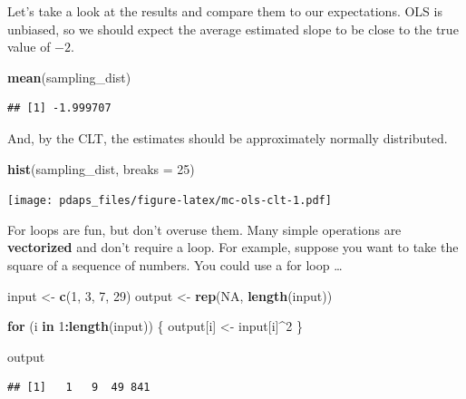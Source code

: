 \documentclass[
  12pt,
  oneside,openany]{book}
\newenvironment{Shaded}{\begin{snugshade}}{\end{snugshade}}
\newcommand{\ControlFlowTok}[1]{\textcolor[rgb]{0.13,0.29,0.53}{\textbf{#1}}}
\newcommand{\DataTypeTok}[1]{\textcolor[rgb]{0.13,0.29,0.53}{#1}}
\newcommand{\DecValTok}[1]{\textcolor[rgb]{0.00,0.00,0.81}{#1}}
\newcommand{\KeywordTok}[1]{\textcolor[rgb]{0.13,0.29,0.53}{\textbf{#1}}}
\newcommand{\NormalTok}[1]{#1}
\newcommand{\OperatorTok}[1]{\textcolor[rgb]{0.81,0.36,0.00}{\textbf{#1}}}
\newcommand{\OtherTok}[1]{\textcolor[rgb]{0.56,0.35,0.01}{#1}}
\newcommand{\StringTok}[1]{\textcolor[rgb]{0.31,0.60,0.02}{#1}}
\begin{document}
Let's take a look at the results and compare them to our expectations.
OLS is unbiased, so we should expect the average estimated slope to be close to the true value of \(-2\).

\begin{Shaded}
\begin{Highlighting}[]
\KeywordTok{mean}\NormalTok{(sampling\_dist)}
\end{Highlighting}
\end{Shaded}

\begin{verbatim}
## [1] -1.999707
\end{verbatim}

And, by the CLT, the estimates should be approximately normally distributed.

\begin{Shaded}
\begin{Highlighting}[]
\KeywordTok{hist}\NormalTok{(sampling\_dist, }\DataTypeTok{breaks =} \DecValTok{25}\NormalTok{)}
\end{Highlighting}
\end{Shaded}

\texttt{[image: pdaps\_files/figure-latex/mc-ols-clt-1.pdf]}

For loops are fun, but don't overuse them. Many simple operations are \textbf{vectorized} and don't require a loop. For example, suppose you want to take the square of a sequence of numbers. You could use a for loop \ldots{}

\begin{Shaded}
\begin{Highlighting}[]
\NormalTok{input <{-}}\StringTok{ }\KeywordTok{c}\NormalTok{(}\DecValTok{1}\NormalTok{, }\DecValTok{3}\NormalTok{, }\DecValTok{7}\NormalTok{, }\DecValTok{29}\NormalTok{)}
\NormalTok{output <{-}}\StringTok{ }\KeywordTok{rep}\NormalTok{(}\OtherTok{NA}\NormalTok{, }\KeywordTok{length}\NormalTok{(input))}

\ControlFlowTok{for}\NormalTok{ (i }\ControlFlowTok{in} \DecValTok{1}\OperatorTok{:}\KeywordTok{length}\NormalTok{(input)) \{}
\NormalTok{  output[i] <{-}}\StringTok{ }\NormalTok{input[i]}\OperatorTok{\^{}}\DecValTok{2}
\NormalTok{\}}

\NormalTok{output}
\end{Highlighting}
\end{Shaded}

\begin{verbatim}
## [1]   1   9  49 841
\end{verbatim}
\end{document}
